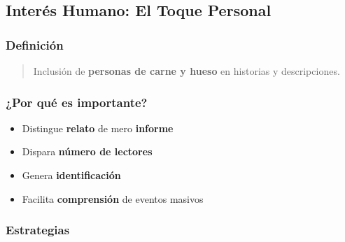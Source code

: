 \documentclass[
  11pt,
]{beaner}
\providecommand{\tightlist}{%
  \setlength{\itemsep}{0pt}\setlength{\parskip}{0pt}}
\begin{document}
\subsection{Interés Humano: El Toque
Personal}\label{interuxe9s-humano-el-toque-personal}

\subsubsection{Definición}\label{definiciuxf3n-4}

\begin{quote}
Inclusión de \textbf{personas de carne y hueso} en historias y
descripciones.
\end{quote}

\subsubsection{¿Por qué es importante?}\label{por-quuxe9-es-importante}

\begin{itemize}
\tightlist
\item
  Distingue \textbf{relato} de mero \textbf{informe}
\item
  Dispara \textbf{número de lectores}
\item
  Genera \textbf{identificación}
\item
  Facilita \textbf{comprensión} de eventos masivos
\end{itemize}

\subsubsection{Estrategias}\label{estrategias}
\end{document}
